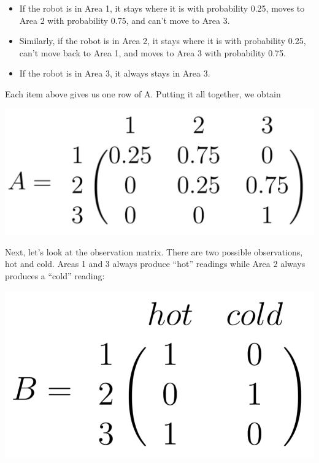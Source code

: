 \documentclass[6008notes.tex]{subfiles}
\begin{document}
\begin{itemize}
\item If the robot is in Area 1, it stays where it is with probability 0.25, moves to Area 2 with probability 0.75, and can't move to Area 3.

\item Similarly, if the robot is in Area 2, it stays where it is with probability 0.25, can't move back to Area 1, and moves to Area 3 with probability 0.75.

\item If the robot is in Area 3, it always stays in Area 3.
\end{itemize}

Each item above gives us one row of A. Putting it all together, we obtain

{\centering\includegraphics[scale=0.25]{images_sec-formulating-hmm-helper1} \par}

Next, let's look at the observation matrix. There are two possible observations, hot and cold. Areas 1 and 3 always produce ``hot'' readings while Area 2 always produces a ``cold'' reading:

{\centering\includegraphics[scale=0.25]{images_sec-formulating-hmm-helper2} \par}
\end{document}
